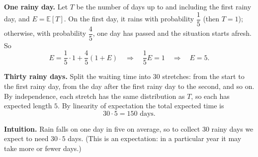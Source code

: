 \textbf{One rainy day.} Let $T$ be the number of days up to and including the first rainy day, and $E=\mathbb{E}[T]$. On the first day, it rains with probability $\dfrac{1}{5}$ (then $T=1$); otherwise, with probability $\dfrac{4}{5}$, one day has passed and the situation starts afresh. So
\[E=\dfrac{1}{5}\cdot1+\dfrac{4}{5}(1+E)\quad\Longrightarrow\quad\dfrac{1}{5}E=1\quad\Longrightarrow\quad E=5.\]

\textbf{Thirty rainy days.} Split the waiting time into $30$ stretches: from the start to the first rainy day, from the day after the first rainy day to the second, and so on. By independence, each stretch has the same distribution as $T$, so each has expected length $5$. By linearity of expectation the total expected time is
\[30\cdot5=\boxed{150}\text{ days}.\]

\textbf{Intuition.} Rain falls on one day in five on average, so to collect $30$ rainy days we expect to need $30\cdot5$ days. (This is an expectation: in a particular year it may take more or fewer days.)
